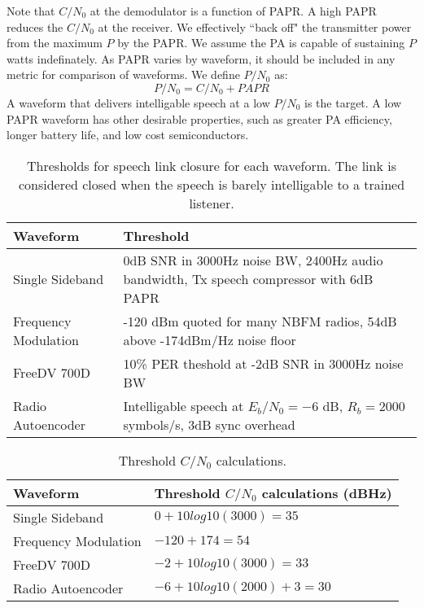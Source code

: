\documentclass{article}
\begin{document}
Note that $C/N_0$ at the demodulator is a function of PAPR.  A high PAPR reduces the $C/N_0$ at the receiver.  We effectively ``back off" the transmitter power from the maximum $P$ by the PAPR.  We assume the PA is capable of sustaining $P$ watts indefinately. As PAPR varies by waveform, it should be included in any metric for comparison of waveforms.  We define $P/N_0$ as:
\begin{equation}
P/N_0 = C/N_0 + PAPR
\end{equation} 
A waveform that delivers intelligable speech at a low $P/N_0$ is the target.  A low PAPR waveform has other desirable properties, such as greater PA efficiency, longer battery life, and low cost semiconductors.

\begin{table} [H]
\centering
\begin{tabular}{  m{3.5cm} | m{7cm}  }
 \hline
 Waveform             & Threshold \\
 \hline
 Single Sideband      & 0dB SNR in 3000Hz noise BW, 2400Hz audio bandwidth, Tx speech compressor with 6dB PAPR \\
 Frequency Modulation & -120 dBm quoted for many NBFM radios, 54dB above -174dBm/Hz noise floor \\
 FreeDV 700D          & 10\% PER theshold at -2dB SNR in 3000Hz noise BW \\
 Radio Autoencoder    & Intelligable speech at $E_b/N_0=-6$ dB, $R_b=2000$ symbols/s, 3dB sync overhead \\
 \hline
\end{tabular}
\caption{Thresholds for speech link closure for each waveform. The link is considered closed when the speech is barely intelligable to a trained listener.}
\label{tab:waveforms_thresh}
\end{table}

\begin{table} [H]
\centering
\begin{tabular}{  m{3.5cm} | m{7cm}  }
 \hline
 Waveform             & Threshold $C/N_0$ calculations (dBHz) \\
 \hline
 Single Sideband      & $0 + 10log10(3000) = 35$ \\
 Frequency Modulation & $-120 + 174 = 54$ \\
 FreeDV 700D          & $-2 + 10log10(3000) = 33$ \\
 Radio Autoencoder    & $-6 + 10log10(2000) + 3 = 30$ \\
 \hline
\end{tabular}
\caption{Threshold $C/N_0$ calculations.}
\label{tab:waveforms_thresh_calc}
\end{table}
\end{document}
